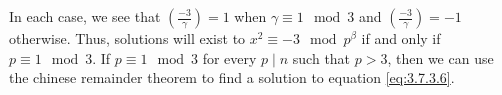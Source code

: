\documentclass[12 pt]{amsart}
\begin{document}
  In each case, we see that 
  $\left( \frac{-3}{\gamma} \right) = 1$ when $\gamma \equiv 1 \mod 3$
  and $\left( \frac{-3}{\gamma} \right) = -1$ otherwise.
  Thus, solutions will exist to 
  $x^2 \equiv -3 \mod p^{\beta}$ if and only if 
  $p \equiv 1 \mod 3$.
%
%
  If $p \equiv 1 \mod 3$ for every 
  $p \mid n$ such that $p > 3$,
  then we can use the chinese remainder theorem to 
  find a solution to 
  equation \ref{eq:3.7.3.6}.
\end{document}
